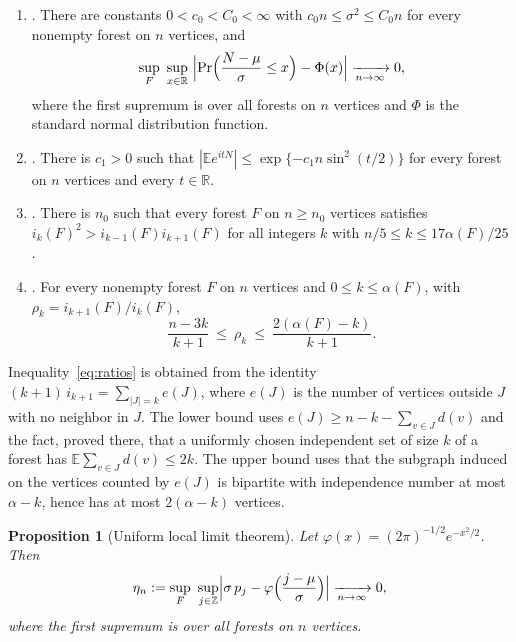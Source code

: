 \documentclass{amsart}
\numberwithin{equation}{section}
\theoremstyle{plain}
\newtheorem{proposition}[theorem]{Proposition}
\theoremstyle{definition}
\theoremstyle{remark}
\newcommand{\R}{\mathbb{R}}
\newcommand{\E}{\mathbb{E}}
\begin{document}
\begin{enumerate}[label=\textup{(F\arabic*)},leftmargin=*]
\item \cite[Proposition~5.1]{FLNYZ}. There are constants $0<c_0<C_0<\infty$ with $c_0n\le\sigma^2\le C_0n$ for every nonempty forest on $n$ vertices, and
\[
\sup_{F}\ \sup_{x\in\R}\ \Bigl|\Pr\Bigl(\frac{N-\mu}{\sigma}\le x\Bigr)-\Phi(x)\Bigr|\xrightarrow[n\to\infty]{}0,
\]
where the first supremum is over all forests on $n$ vertices and $\Phi$ is the standard normal distribution function.
\item \cite[Lemma~6.1]{FLNYZ}. There is $c_1>0$ such that $|\E e^{itN}|\le\exp\{-c_1n\sin^2(t/2)\}$ for every forest on $n$ vertices and every $t\in\R$.
\item \cite[Theorem~1.2]{FLNYZ}. There is $n_0$ such that every forest $F$ on $n\ge n_0$ vertices satisfies $i_k(F)^2>i_{k-1}(F)i_{k+1}(F)$ for all integers $k$ with $n/5\le k\le17\alpha(F)/25$.
\item \cite[proof of Proposition~8.2]{FLNYZ}. For every nonempty forest $F$ on $n$ vertices and $0\le k\le\alpha(F)$, with $\rho_k=i_{k+1}(F)/i_k(F)$,
\begin{equation}\label{eq:ratios}
\frac{n-3k}{k+1}\ \le\ \rho_k\ \le\ \frac{2(\alpha(F)-k)}{k+1}.
\end{equation}
\end{enumerate}
Inequality~\eqref{eq:ratios} is obtained from the identity $(k+1)\,i_{k+1}=\sum_{|J|=k}e(J)$, where $e(J)$ is the number of vertices outside $J$ with no neighbor in $J$. The lower bound uses $e(J)\ge n-k-\sum_{v\in J}d(v)$ and the fact, proved there, that a uniformly chosen independent set of size $k$ of a forest has $\E\sum_{v\in J}d(v)\le2k$. The upper bound uses that the subgraph induced on the vertices counted by $e(J)$ is bipartite with independence number at most $\alpha-k$, hence has at most $2(\alpha-k)$ vertices.

\begin{proposition}[Uniform local limit theorem]\label{prop:llt}
Let $\varphi(x)=(2\pi)^{-1/2}e^{-x^2/2}$. Then
\[
\eta_n:=\sup_{F}\ \sup_{j\in\mathbb Z}\Bigl|\sigma\,p_j-\varphi\Bigl(\frac{j-\mu}{\sigma}\Bigr)\Bigr|\xrightarrow[n\to\infty]{}0,
\]
where the first supremum is over all forests on $n$ vertices.
\end{proposition}
\end{document}
